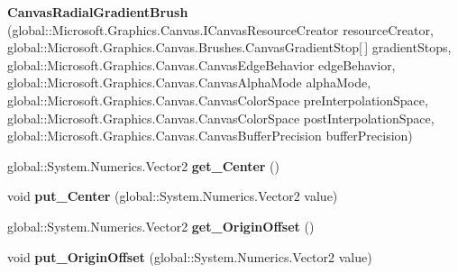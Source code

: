 \begin{DoxyCompactItemize}
\item 
\mbox{\label{class_microsoft_1_1_graphics_1_1_canvas_1_1_brushes_1_1_canvas_radial_gradient_brush_a5bcd11137c2799ca1ee5edea427d5ecb}} 
{\bfseries Canvas\+Radial\+Gradient\+Brush} (global\+::\+Microsoft.\+Graphics.\+Canvas.\+I\+Canvas\+Resource\+Creator resource\+Creator, global\+::\+Microsoft.\+Graphics.\+Canvas.\+Brushes.\+Canvas\+Gradient\+Stop\mbox{[}$\,$\mbox{]} gradient\+Stops, global\+::\+Microsoft.\+Graphics.\+Canvas.\+Canvas\+Edge\+Behavior edge\+Behavior, global\+::\+Microsoft.\+Graphics.\+Canvas.\+Canvas\+Alpha\+Mode alpha\+Mode, global\+::\+Microsoft.\+Graphics.\+Canvas.\+Canvas\+Color\+Space pre\+Interpolation\+Space, global\+::\+Microsoft.\+Graphics.\+Canvas.\+Canvas\+Color\+Space post\+Interpolation\+Space, global\+::\+Microsoft.\+Graphics.\+Canvas.\+Canvas\+Buffer\+Precision buffer\+Precision)
\item 
\mbox{\label{class_microsoft_1_1_graphics_1_1_canvas_1_1_brushes_1_1_canvas_radial_gradient_brush_a43413929c2a98e600a2c1dbe5ca5bd5d}} 
global\+::\+System.\+Numerics.\+Vector2 {\bfseries get\+\_\+\+Center} ()
\item 
\mbox{\label{class_microsoft_1_1_graphics_1_1_canvas_1_1_brushes_1_1_canvas_radial_gradient_brush_a8fb60dbea8079a04d895966bf57a6cd4}} 
void {\bfseries put\+\_\+\+Center} (global\+::\+System.\+Numerics.\+Vector2 value)
\item 
\mbox{\label{class_microsoft_1_1_graphics_1_1_canvas_1_1_brushes_1_1_canvas_radial_gradient_brush_a5c218cf977932ca4601e2986eb75f50d}} 
global\+::\+System.\+Numerics.\+Vector2 {\bfseries get\+\_\+\+Origin\+Offset} ()
\item 
\mbox{\label{class_microsoft_1_1_graphics_1_1_canvas_1_1_brushes_1_1_canvas_radial_gradient_brush_ab81418298a8dbc0342347dc836ff9a7f}} 
void {\bfseries put\+\_\+\+Origin\+Offset} (global\+::\+System.\+Numerics.\+Vector2 value)
\item 

\end{DoxyCompactItemize}
